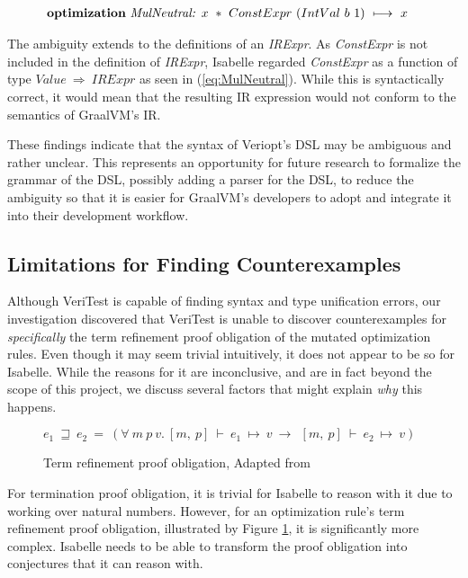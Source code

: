 \begin{align}
    &\text{\textbf{optimization} \emph{MulNeutral: }} x~*~ConstExpr~(IntVal~b~1)~\longmapsto~x \label{eq:MulNeutral}
\end{align}

The ambiguity extends to the definitions of an \emph{IRExpr}. As \emph{ConstExpr} is not included in the definition of \emph{IRExpr}, 
Isabelle regarded \emph{ConstExpr} as a function of type \(Value~\Rightarrow~IRExpr\) as seen in (\ref{eq:MulNeutral}).
While this is syntactically correct, it would mean that the resulting IR expression would not conform to the semantics of GraalVM's IR.

These findings indicate that the syntax of Veriopt's DSL may be ambiguous and rather unclear. This represents an opportunity for future research to 
formalize the grammar of the DSL, possibly adding a parser for the DSL, to reduce the ambiguity so that it is easier for 
GraalVM's developers to adopt and integrate it into their development workflow.

\subsection{Limitations for Finding Counterexamples}

Although VeriTest is capable of finding syntax and type unification errors, our investigation discovered that VeriTest is unable to 
discover counterexamples for \emph{specifically} the term refinement proof obligation of the mutated optimization rules. 
Even though it may seem trivial intuitively, it does not appear to be so for Isabelle. While the reasons for it are inconclusive, 
and are in fact beyond the scope of this project, we discuss several factors that might explain \emph{why} this happens.

\begin{figure}[!htb]
    \centering
    \(e_1~\sqsupseteq~e_2~=~(\forall~m~p~v.~[m,~p]~\vdash~e_1~\mapsto~v~\longrightarrow~~[m,~p]~\vdash~e_2~\mapsto~v)\)

    \caption{Term refinement proof obligation, Adapted from \cite[Definition 6]{Term_Graph_Optimizations}}
    \label{fig:RefinementProofObligation}
\end{figure}

For termination proof obligation, it is trivial for Isabelle to reason with it due to working over natural numbers. However, 
for an optimization rule's term refinement proof obligation, illustrated by Figure \ref{fig:RefinementProofObligation}, it is 
significantly more complex. Isabelle needs to be able to transform the proof obligation into conjectures that it can reason with.

